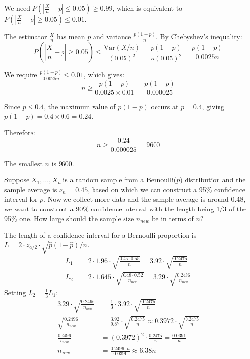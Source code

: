 \documentclass{article}
\newcommand{\V}{\text{Var}}
\begin{document}
\begin{probset}
\begin{prob}[\textbf{5.3.26}]
    \begin{soln}
        We need $P(|\frac{X}{n} - p| \leq 0.05) \geq 0.99$, which is equivalent to $P(|\frac{X}{n} - p| \geq 0.05) \leq 0.01$.
        
        The estimator $\frac{X}{n}$ has mean $p$ and variance $\frac{p(1-p)}{n}$. By Chebyshev's inequality:
        \[
            P\left(\left|\frac{X}{n} - p\right| \geq 0.05\right) \leq \frac{\V(X/n)}{(0.05)^2} = \frac{p(1-p)}{n(0.05)^2} = \frac{p(1-p)}{0.0025n}
        \]
        
        We require $\frac{p(1-p)}{0.0025n} \leq 0.01$, which gives:
        \[
            n \geq \frac{p(1-p)}{0.0025 \times 0.01} = \frac{p(1-p)}{0.000025}
        \]
        
        Since $p \leq 0.4$, the maximum value of $p(1-p)$ occurs at $p = 0.4$, giving $p(1-p) = 0.4 \times 0.6 = 0.24$.
        
        Therefore:
        \[
            n \geq \frac{0.24}{0.000025} = 9600
        \]
        
        The smallest $n$ is 9600.
    \end{soln}
\end{prob}

\newpage

\begin{prob}
    Suppose $X_1, \ldots, X_n$ is a random sample from a Bernoulli($p$) distribution and the sample average is $\bar{x}_n = 0.45$, based on which we can construct a 95\% confidence interval for $p$. Now we collect more data and the sample average is around 0.48, we want to construct a 90\% confidence interval with the length being 1/3 of the 95\% one. How large should the sample size $n_{new}$ be in terms of $n$?

    \begin{soln}
        The length of a confidence interval for a Bernoulli proportion is $L = 2 \cdot z_{\alpha/2} \cdot \sqrt{\hat{p}(1-\hat{p})/n}$.
        \begin{align*}
            L_1 &= 2 \cdot 1.96 \cdot \sqrt{\frac{0.45 \cdot 0.55}{n}} = 3.92 \cdot \sqrt{\frac{0.2475}{n}} \\
            L_2 &= 2 \cdot 1.645 \cdot \sqrt{\frac{0.48 \cdot 0.52}{n_{new}}} = 3.29 \cdot \sqrt{\frac{0.2496}{n_{new}}}
        \end{align*}
        Setting $L_2 = \frac{1}{3} L_1$:
        \begin{align*}
            3.29 \cdot \sqrt{\frac{0.2496}{n_{new}}} &= \frac{1}{3} \cdot 3.92 \cdot \sqrt{\frac{0.2475}{n}} \\
            \sqrt{\frac{0.2496}{n_{new}}} &= \frac{3.92}{9.87} \cdot \sqrt{\frac{0.2475}{n}} \approx 0.3972 \cdot \sqrt{\frac{0.2475}{n}} \\
            \frac{0.2496}{n_{new}} &= (0.3972)^2 \cdot \frac{0.2475}{n} = \frac{0.0391}{n} \\
            n_{new} &= \frac{0.2496 \cdot n}{0.0391} \approx 6.38n
        \end{align*}
    \end{soln}
\end{prob}


\end{probset}
\end{document}
